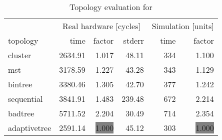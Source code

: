 \begin{table}[htb]
  \centering
  \begin{tabular}{lrrrrr}
  \toprule
  & \multicolumn{3}{c}{Real hardware [cycles]} & \multicolumn{2}{c}{Simulation [units]} \\
  topology & time & factor & stderr & time & factor \\
  \midrule
  cluster & 2634.91 & 1.017 & 48.11 & 334 & 1.100 \\
  mst & 3178.59 & 1.227 & 43.28 & 343 & 1.129 \\
  bintree & 3380.46 & 1.305 & 42.70 & 377 & 1.242 \\
  sequential & 3841.91 & 1.483 & 239.48 & 672 & 2.214 \\
  badtree & 5711.52 & 2.204 & 30.49 & 714 & 2.354 \\
  adaptivetree & 2591.14 & \colorbox{gray}{1.000} & 45.12 & 303 & \colorbox{gray}{1.000} \\
  \midrule
  \end{tabular}
  \caption{Topology evaluation for \ziger}
  \label{tab:ziger}
\end{table}
